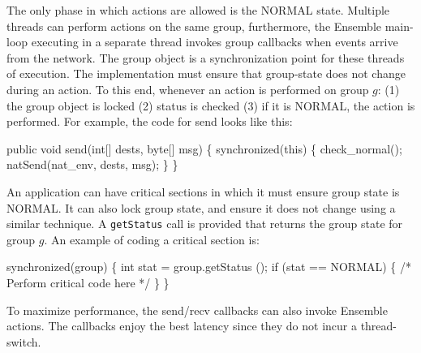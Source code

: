 The only phase in which actions are allowed is the NORMAL state.
Multiple threads can perform actions on the same group, furthermore,
the Ensemble main-loop executing in a separate thread invokes group
callbacks when events arrive from the network. The group object is a
synchronization point for these threads of execution. The
implementation must ensure that group-state does not change during an
action. To this end, whenever an action is performed on group $g$: (1) the
group object is locked (2) status is checked (3) if it is NORMAL, the
action is performed. For example, the code for send looks like this:
\begin{codebox}
    public void send(int[] dests, byte[] msg) \{
        synchronized(this) \{
	    check_normal();
	    natSend(nat_env, dests, msg);
        \}
    \}
\end{codebox}

An application can have critical sections in which it must ensure
group state is NORMAL. It can also lock group state, and ensure it
does not change using a similar technique. A {\tt getStatus}
call is provided that returns the group state for group $g$. An example
of coding a critical section is:
\begin{codebox}
    synchronized(group) \{
        int stat = group.getStatus ();
        if (stat == NORMAL) \{
             /* Perform critical code here */
        \}
    \}
\end{codebox}

To maximize performance, the send/recv callbacks can also invoke
Ensemble actions. The callbacks enjoy the best latency since they do
not incur a thread-switch. 

